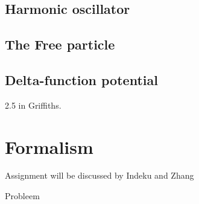 \documentclass[dutch,course]{lecture}
\begin{document}

\subsection*{Harmonic oscillator}
\subsection*{The Free particle}
\subsection*{Delta-function potential}

2.5 in Griffiths.



\section{Formalism}





Assignment will be discussed by Indeku and Zhang

\begin{problem}
Probleem
\end{problem}
\end{document}
